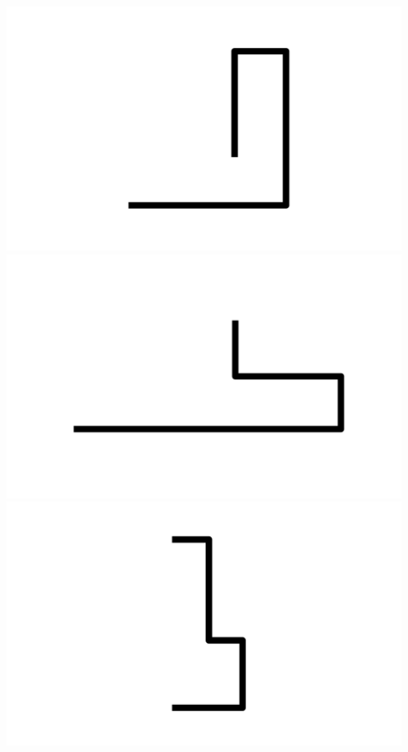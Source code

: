 \documentclass[]{report}
\begin{document}
\includegraphics[scale=.1]{pictures/21/state_cluster_shapes_55.pdf} 
\includegraphics[scale=.1]{pictures/21/state_cluster_shapes_56.pdf} 
\includegraphics[scale=.1]{pictures/21/state_cluster_shapes_57.pdf} 
\end{document}
